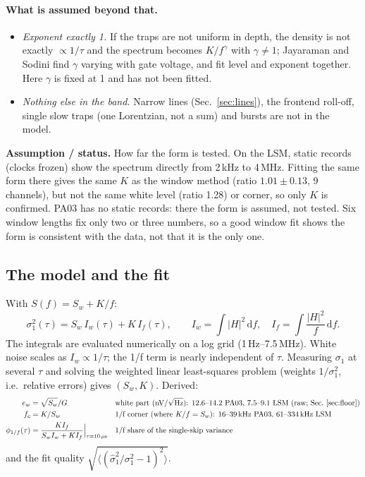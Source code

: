\documentclass[10pt,a4paper]{article}
\newcommand{\dd}{\,\mathrm{d}}
\newcommand{\caveat}[1]{\par\smallskip\noindent\colorbox{orange!10}{\parbox{\dimexpr\linewidth-2\fboxsep}{\small\textbf{Assumption / status.} #1}}\par\smallskip}
\begin{document}
\paragraph{What is assumed beyond that.}
\begin{itemize}
\item \emph{Exponent exactly 1.} If the traps are not uniform in depth, the density is not exactly $\propto1/\tau$ and
the spectrum becomes $K/f^{\gamma}$ with $\gamma\ne1$; Jayaraman and Sodini \cite{jayaraman1989} find $\gamma$
varying with gate voltage, and fit level and exponent together. Here $\gamma$ is fixed at 1 and has not been fitted.
\item \emph{Nothing else in the band.} Narrow lines (Sec.~\ref{sec:lines}), the frontend roll-off, single slow traps
(one Lorentzian, not a sum) and bursts are not in the model.
\end{itemize}
\caveat{How far the form is tested. On the LSM, static records (clocks frozen) show the spectrum directly from 2\,kHz
to 4\,MHz. Fitting the same form there gives the same $K$ as the window method (ratio $1.01\pm0.13$, 9 channels), but
not the same white level (ratio 1.28) or corner, so only $K$ is confirmed. PA03 has no static records: there the form
is assumed, not tested. Six window lengths fix only two or three numbers, so a good window fit shows the form is
consistent with the data, not that it is the only one.}

\subsection{The model and the fit}
With $S(f)=S_w+K/f$:
\begin{equation}
\sigma_1^2(\tau)=S_w\,I_w(\tau)+K\,I_f(\tau),\qquad
I_w=\int|H|^2\dd f,\quad I_f=\int\frac{|H|^2}{f}\dd f .
\end{equation}
The integrals are evaluated numerically on a log grid (1\,Hz--7.5\,MHz). White noise scales as $I_w\propto1/\tau$;
the 1/f term is nearly independent of $\tau$. Measuring $\sigma_1$ at several $\tau$ and solving the weighted linear
least-squares problem (weights $1/\sigma_1^2$, i.e.\ relative errors) gives $(S_w,K)$. Derived:
\begin{align}
e_w&=\sqrt{S_w}/G &&\text{white part (nV/}\sqrt{\text{Hz}}\text{): 12.6--14.2 PA03, 7.5--9.1 LSM (raw; Sec.~\ref{sec:floor})}\\
f_c&=K/S_w &&\text{1/f corner (where } K/f=S_w\text{): 16--39\,kHz PA03, 61--334\,kHz LSM}\\
\phi_{1/f}(\tau)&=\frac{K I_f}{S_w I_w+K I_f}\Big|_{\tau=10\,\mu\text{s}} &&\text{1/f share of the single-skip variance}
\end{align}
and the fit quality $\sqrt{\langle(\hat\sigma_1^2/\sigma_1^2-1)^2\rangle}$.
\end{document}
